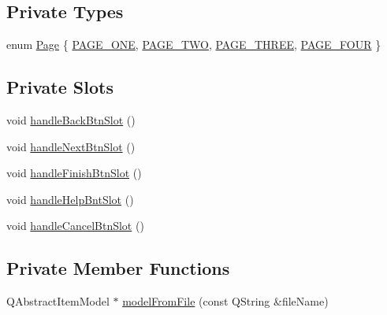 \subsection*{Private Types}
\begin{DoxyCompactItemize}
\item 
enum \hyperlink{class_new_file_gui_aa420702f51dbeefc704d546f1db144ac}{Page} \{ \hyperlink{class_new_file_gui_aa420702f51dbeefc704d546f1db144acab331f50bb023c696186edd5033b87462}{P\-A\-G\-E\-\_\-\-O\-N\-E}, 
\hyperlink{class_new_file_gui_aa420702f51dbeefc704d546f1db144aca80e5a1b1a11c76c1813a66e5742336dc}{P\-A\-G\-E\-\_\-\-T\-W\-O}, 
\hyperlink{class_new_file_gui_aa420702f51dbeefc704d546f1db144aca20553a422680bc600e39dcbd9615273f}{P\-A\-G\-E\-\_\-\-T\-H\-R\-E\-E}, 
\hyperlink{class_new_file_gui_aa420702f51dbeefc704d546f1db144aca3e2121cb48d9c9adbec8732efcc8de1e}{P\-A\-G\-E\-\_\-\-F\-O\-U\-R}
 \}
\end{DoxyCompactItemize}
\subsection*{Private Slots}
\begin{DoxyCompactItemize}
\item 
void \hyperlink{class_new_file_gui_a0026dbfc8bd314dc7d0a90ef23995724}{handle\-Back\-Btn\-Slot} ()
\item 
void \hyperlink{class_new_file_gui_ac5ff3b20c4c0a6b863a220073dc232d9}{handle\-Next\-Btn\-Slot} ()
\item 
void \hyperlink{class_new_file_gui_a50cf414bdb9ea40f3cd4ca4fa4566b77}{handle\-Finish\-Btn\-Slot} ()
\item 
void \hyperlink{class_new_file_gui_a32ecca09a47e1ee6d8619e4d6d8c10be}{handle\-Help\-Bnt\-Slot} ()
\item 
void \hyperlink{class_new_file_gui_a137c2e64fa0cebe11c92bd38be955be5}{handle\-Cancel\-Btn\-Slot} ()
\end{DoxyCompactItemize}
\subsection*{Private Member Functions}
\begin{DoxyCompactItemize}
\item 
Q\-Abstract\-Item\-Model $\ast$ \hyperlink{class_new_file_gui_a4ff330f407388321ba41817b3b3c8240}{model\-From\-File} (const Q\-String \&file\-Name)
\end{DoxyCompactItemize}
